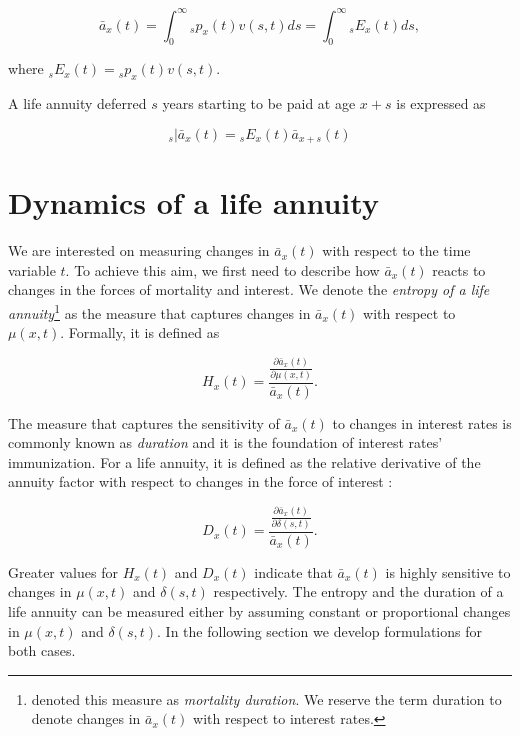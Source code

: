 \documentclass[12pt]{article}
\begin{document}
\begin{equation}\label{eq:Annuity}
\bar{a}_x(t) = \int_0^\infty {}_sp_x(t) {v}(s,t)ds = \int_0^\infty {}_sE_x(t) ds,
\end{equation}

where ${}_sE_x(t)={}_sp_x(t) {v}(s,t)$. 



A life annuity deferred $s$ years starting to be paid at age $x+s$ is expressed as


\begin{equation}\label{eq:DefAnnuity}
{}_s|\bar{a}_x(t) = {}_sE_x(t) \bar{a}_{x+s}(t)
\end{equation}


\section{Dynamics of a life annuity}


We are interested on measuring changes in $\bar{a}_x(t)$ with respect to the time variable $t$. To achieve this aim, we first need to describe how $\bar{a}_x(t)$ reacts to changes in the forces of mortality and interest. We denote the \textit{entropy of a life annuity}\footnote{\cite{Tsai2011,Tsai2013a,Lin2020} denoted this measure as \textit{mortality duration}. We reserve the term duration to denote changes in $\bar{a}_x(t)$ with respect to interest rates.} as the measure that captures changes in $\bar{a}_x(t)$ with respect to $\mu(x,t)$. Formally, it is defined as 

\begin{equation}\label{eq:EntropyGeneral}
{H}_{x}(t) = \frac{ \frac{\partial \bar{a}_x(t) }{\partial \mu(x,t)}}{\bar{a}_x(t)}.
\end{equation}

The measure that captures the sensitivity of $\bar{a}_x(t)$ to changes in interest rates is commonly known as \textit{duration} and it is the foundation of interest rates' immunization. For a life annuity, it is defined as the relative derivative of the annuity factor with respect to changes in the force of interest \citep{Milevsky2012}:


\begin{equation}\label{eq:DurationGeneral}
{D}_{x}(t) = \frac{ \frac{\partial \bar{a}_x(t) }{\partial \delta(s,t)}}{\bar{a}_x(t)}.
\end{equation}

Greater values for ${H}_{x}(t)$ and ${D}_{x}(t)$ indicate that $\bar{a}_x(t)$ is highly sensitive to changes in $\mu(x,t)$ and $\delta(s,t)$ respectively. The entropy and the duration of a life annuity can be measured either by assuming constant or proportional changes in $\mu(x,t)$ and $\delta(s,t)$. In the following section we develop formulations for both cases. 
\end{document}
